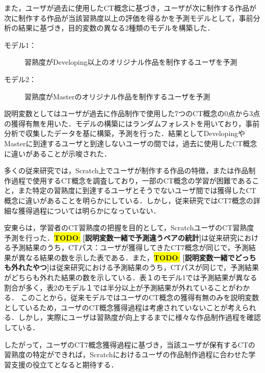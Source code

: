 \documentclass[11pt,dvipdfmx]{jreport}
\newcommand{\todo}[1]{\colorbox{yellow}{{\bf TODO}:}{\color{red} {\textbf{[#1]}}}}
\begin{document}
また，ユーザが過去に使用したCT概念に基づき，ユーザが次に制作する作品が次に制作する作品が当該習熟度以上の評価を得るかを予測モデルとして，事前分析の結果に基づき，目的変数の異なる2種類のモデルを構築した．

\begin{description}
\item [モデル1：]習熟度がDeveloping以上のオリジナル作品を制作するユーザを予測
\item [モデル2：]習熟度がMasterのオリジナル作品を制作するユーザを予測
\end{description}

説明変数としてはユーザが過去に作品制作で使用した7つのCT概念の0点から3点の獲得有無を用いた．モデルの構築にはランダムフォレストを用いており，事前分析で収集したデータを基に構築，予測を行った．結果としてDevelopingやMasterに到達するユーザと到達しないユーザの間では，過去に使用したCT概念に違いがあることが示唆された．

多くの従来研究では，Scratch上でユーザが制作する作品の特徴，または作品制作過程で使用するCT概念を調査しており，一部のCT概念の学習が困難であること，また特定の習熟度に到達するユーザとそうでないユーザ間では獲得したCT概念に違いがあることを明らかにしている．しかし，従来研究ではCT7概念の詳細な獲得過程については明らかになっていない．

安東らは，学習者のCT習熟度の把握を目的として，ScratchユーザのCT習熟度予測を行った．\todo{説明変数一緒で予測違うペアの統計}は従来研究における予測結果のうち，CTパス：ユーザが獲得してきたCT7概念が同じで，予測結果が異なる結果の数を示した表である．また，\todo{説明変数一緒でどっちも外れたやつ}は従来研究における予測結果のうち，CTパスが同じで，予測結果がどちらも外れた結果の数を示している．表１のモデル1では予測結果が異なる割合が多く，表2のモデル１では半分以上が予測結果が外れていることがわかる．
このことから，従来モデルではユーザのCT概念の獲得有無のみを説明変数としているため，ユーザのCT概念獲得過程は考慮されていないことが考えられる．しかし，実際にユーザは習熟度が向上するまでに様々な作品制作過程を確認している．

したがって，ユーザのCT7概念獲得過程に基づき，当該ユーザが保有するCTの習熟度の特定ができれば，Scratchにおけるユーザの作品制作過程に合わせた学習支援の役立てとなると期待する．
\end{document}
